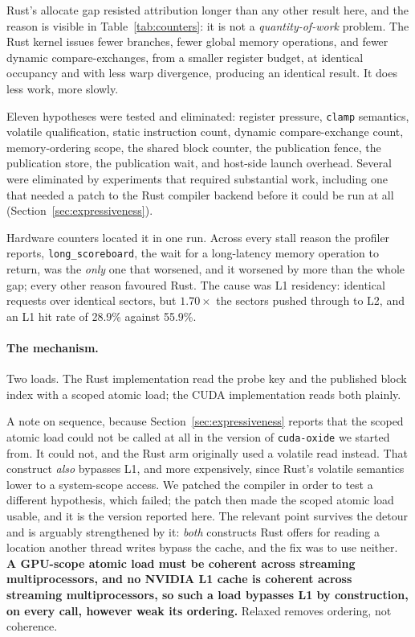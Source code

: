 \documentclass[11pt]{article}
\begin{document}
Rust's allocate gap resisted attribution longer than any other result here, and
the reason is visible in Table~\ref{tab:counters}: it is not a
\emph{quantity-of-work} problem. The Rust kernel issues fewer branches, fewer
global memory operations, and fewer dynamic compare-exchanges, from a smaller
register budget, at identical occupancy and with less warp divergence, producing
an identical result. It does less work, more slowly.

Eleven hypotheses were tested and eliminated: register pressure, \texttt{clamp}
semantics, volatile qualification, static instruction count, dynamic
compare-exchange count, memory-ordering scope, the shared block counter, the
publication fence, the publication store, the publication wait, and host-side
launch overhead. Several were eliminated by experiments that required
substantial work, including one that needed a patch to the Rust compiler backend
before it could be run at all (Section~\ref{sec:expressiveness}).

Hardware counters located it in one run. Across every stall reason the profiler
reports, \texttt{long\_scoreboard}, the wait for a long-latency memory operation
to return, was the \emph{only} one that worsened, and it worsened by more than the
whole gap; every other reason favoured Rust. The cause was L1 residency:
identical requests over identical sectors, but $1.70\times$ the sectors pushed
through to L2, and an L1 hit rate of 28.9\% against 55.9\%.

\paragraph{The mechanism.} Two loads. The Rust implementation read the probe key
and the published block index with a scoped atomic load; the CUDA implementation
reads both plainly.

A note on sequence, because Section~\ref{sec:expressiveness} reports that the
scoped atomic load could not be called at all in the version of
\texttt{cuda-oxide} we started from. It could not, and the Rust arm originally
used a volatile read instead. That construct \emph{also} bypasses L1, and more
expensively, since Rust's volatile semantics lower to a system-scope access. We
patched the compiler in order to test a different hypothesis, which failed; the
patch then made the scoped atomic load usable, and it is the version reported
here. The relevant point survives the detour and is arguably strengthened by it:
\emph{both} constructs Rust offers for reading a location another thread writes
bypass the cache, and the fix was to use neither. \textbf{A GPU-scope atomic load must be coherent across
streaming multiprocessors, and no NVIDIA L1 cache is coherent across streaming
multiprocessors, so such a load bypasses L1 by construction, on every call,
however weak its ordering.} Relaxed removes ordering, not coherence.
\end{document}
